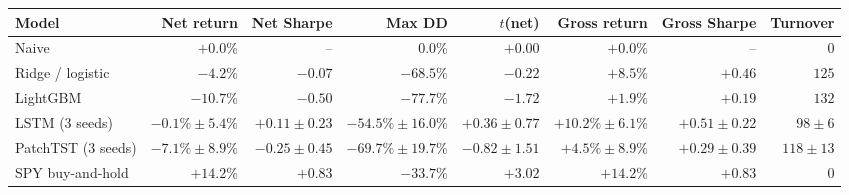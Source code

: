 \begin{tabular}{lrrrrrrr}
\toprule
Model & Net return & Net Sharpe & Max DD & $t$(net) & Gross return & Gross Sharpe & Turnover \\
\midrule
Naive & $+0.0\%$ & -- & $0.0\%$ & $+0.00$ & $+0.0\%$ & -- & $0$ \\
Ridge / logistic & $-4.2\%$ & $-0.07$ & $-68.5\%$ & $-0.22$ & $+8.5\%$ & $+0.46$ & $125$ \\
LightGBM & $-10.7\%$ & $-0.50$ & $-77.7\%$ & $-1.72$ & $+1.9\%$ & $+0.19$ & $132$ \\
LSTM (3 seeds) & $-0.1\% \pm 5.4\%$ & $+0.11 \pm 0.23$ & $-54.5\% \pm 16.0\%$ & $+0.36 \pm 0.77$ & $+10.2\% \pm 6.1\%$ & $+0.51 \pm 0.22$ & $98 \pm 6$ \\
PatchTST (3 seeds) & $-7.1\% \pm 8.9\%$ & $-0.25 \pm 0.45$ & $-69.7\% \pm 19.7\%$ & $-0.82 \pm 1.51$ & $+4.5\% \pm 8.9\%$ & $+0.29 \pm 0.39$ & $118 \pm 13$ \\
SPY buy-and-hold & $+14.2\%$ & $+0.83$ & $-33.7\%$ & $+3.02$ & $+14.2\%$ & $+0.83$ & $0$ \\
\bottomrule
\end{tabular}
